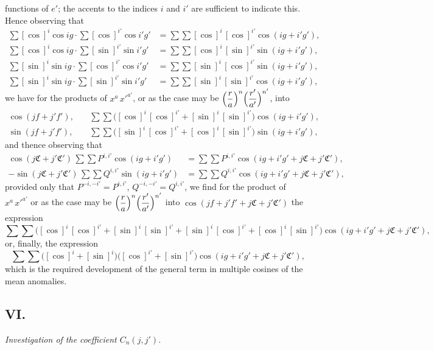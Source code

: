 \documentclass[12pt,a4paper]{article}
\theoremstyle{plain}
\begin{document}
\newpage
{} functions of $e'$; the accents to the indices $i$ and $i'$ are sufficient to indicate this. Hence observing that
\begin{align*}
\sum[\cos]^{i}\cos ig\cdot \sum[\cos]^{i'}\cos i'g' &= \sum\!\sum[\cos]^{i}\,[\cos]^{i'}\cos(ig+i'g'),\\
\sum[\cos]^{i}\cos ig\cdot \sum[\sin]^{i'}\sin i'g' &= \sum\!\sum[\cos]^{i}\,[\sin]^{i'}\sin(ig+i'g'),\\
\sum[\sin]^{i}\sin ig\cdot \sum[\cos]^{i'}\cos i'g' &= \sum\!\sum[\sin]^{i}\,[\cos]^{i'}\sin(ig+i'g'),\\
\sum[\sin]^{i}\sin ig\cdot \sum[\sin]^{i'}\sin i'g' &= \sum\!\sum[\sin]^{i}\,[\sin]^{i'}\cos(ig+i'g'),
\end{align*}
we have for the products of $x^{a}\,x'^{a'}$, or as the case may be $\Bigl(\dfrac{r}{a}\Bigr)^{n}\Bigl(\dfrac{r'}{a'}\Bigr)^{n'}$, into
\begin{align*}
\cos(jf+j'f'), &\quad \sum\!\sum\bigl([\cos]^{i}\,[\cos]^{i'}+[\sin]^{i}\,[\sin]^{i'}\bigr)\cos(ig+i'g'),\\
\sin(jf+j'f'), &\quad \sum\!\sum\bigl([\sin]^{i}\,[\cos]^{i'}+[\cos]^{i}\,[\sin]^{i'}\bigr)\sin(ig+i'g'),
\end{align*}
and thence observing that
\begin{align*}
\cos(j\mathfrak{C}+j'\mathfrak{C}')\,\sum\!\sum P^{i,i'}\cos(ig+i'g') &= \sum\!\sum P^{i,i'}\cos(ig+i'g'+j\mathfrak{C}+j'\mathfrak{C}'),\\
-\sin(j\mathfrak{C}+j'\mathfrak{C}')\,\sum\!\sum Q^{i,i'}\sin(ig+i'g') &= \sum\!\sum Q^{i,i'}\cos(ig+i'g'+j\mathfrak{C}+j'\mathfrak{C}'),
\end{align*}
provided only that $P^{-i,-i'}=P^{i,i'}$, $Q^{-i,-i'}=Q^{i,i'}$, we find for the product of $x^{a}\,x'^{a'}$ or as the case may be $\Bigl(\dfrac{r}{a}\Bigr)^{n}\Bigl(\dfrac{r'}{a'}\Bigr)^{n'}$ into $\cos(jf+j'f'+j\mathfrak{C}+j'\mathfrak{C}')$ the expression
\[
\sum\!\sum\bigl([\cos]^{i}\,[\cos]^{i'}+[\sin]^{i}\,[\sin]^{i'}+[\sin]^{i}\,[\cos]^{i'}+[\cos]^{i}\,[\sin]^{i'}\bigr)\cos(ig+i'g'+j\mathfrak{C}+j'\mathfrak{C}'),
\]
or, finally, the expression
\[
\sum\!\sum\bigl([\cos]^{i}+[\sin]^{i}\bigr)\bigl([\cos]^{i'}+[\sin]^{i'}\bigr)\cos(ig+i'g'+j\mathfrak{C}+j'\mathfrak{C}'),
\]
which is the required development of the general term in multiple cosines of the mean anomalies.

\medskip
\subsection*{VI.}
\textit{Investigation of the coefficient $C_{n}(j,j')$.}
\end{document}
